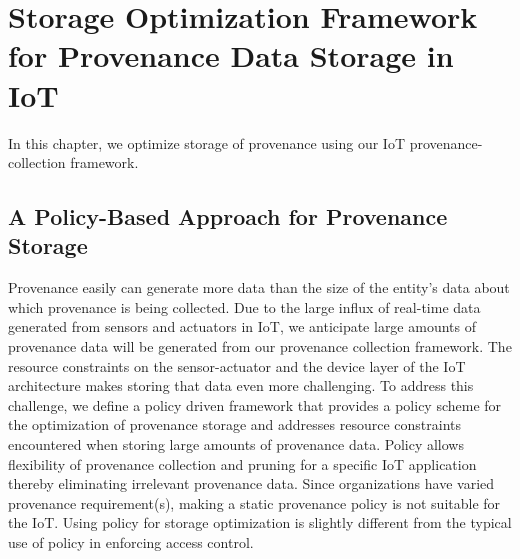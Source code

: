 
\chapter{Storage Optimization Framework for Provenance Data Storage in IoT} \label{MostNarrowEasy}

In this chapter, we optimize storage of provenance using our IoT provenance-collection framework.

%
%


\section{A Policy-Based Approach for Provenance Storage}
\par Provenance easily can generate more data than the size of the entity's data about  which provenance is being collected. Due to the large influx of real-time data generated from sensors and actuators in IoT, we anticipate large amounts of provenance data will be generated from our provenance collection framework. The resource constraints on the sensor-actuator and the device layer of the IoT architecture makes storing that data even more challenging. To address this challenge, we define a policy driven framework that provides a policy scheme for the optimization of provenance storage and addresses resource constraints encountered when storing large amounts of provenance data. Policy allows flexibility of provenance collection and pruning for a specific IoT application thereby eliminating irrelevant provenance data. Since organizations have varied provenance requirement(s), making a static provenance policy is not suitable for the IoT. Using policy for storage optimization is slightly different from the typical use of policy in enforcing access control. 



